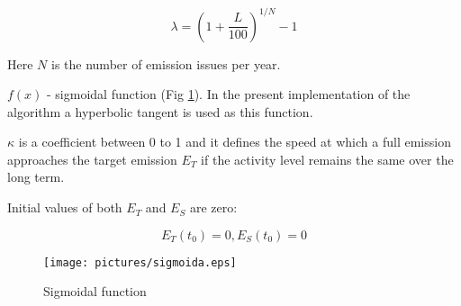 \documentclass[a4paper,12pt]{article}
\begin{document}
$$
    \lambda = (1 + \frac{L}{100})^{1/N}-1
$$

Here $N$ is the number of emission issues per year.


$f(x)$ - sigmoidal function (Fig \ref{fig:sigmoida}). In the present implementation of the algorithm a hyperbolic tangent is used as this function. 


$\kappa$ is a coefficient between 0 to 1 and it defines the speed at which a full emission approaches the target emission $E_T$ if the activity level remains the same over the long term.


Initial values of both $E_T$ and $E_S$ are zero:


$$
E_T(t_0)=0, E_S(t_0)=0
$$


\begin{figure}[h]
      \texttt{[image: pictures/sigmoida.eps]}
      \caption{Sigmoidal function}
      \label{fig:sigmoida}
\end{figure}
\end{document}
